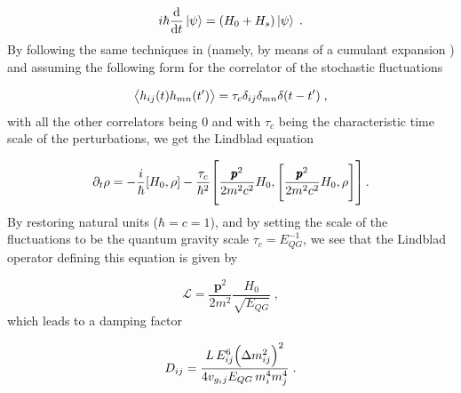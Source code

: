 \documentclass[11pt]{article}
\begin{document}
\begin{equation}
     i\hbar \dv{}{t}\ket{\psi} = \qty(H_0+H_s)\ket{\psi}\;.
\end{equation}
By following the same techniques in \cite{Petruzziello:2020wkd} (namely, by means of a cumulant expansion \cite{VANKAMPEN1974215}) and assuming the following form for the correlator of the stochastic fluctuations \cite{Breuer:2008rh}

\begin{equation}
    \expval{h_{ij}(t)h_{mn}(t^\prime)} = \tau_c \delta_{ij}\delta_{mn}\delta(t-t^\prime)\;,
\end{equation}
with all the other correlators being $0$ and with $\tau_c$ being the characteristic time scale of the perturbations, we get the Lindblad equation

\begin{equation}
    \partial_t \rho = -\frac{i}{\hbar}\comm{H_0}{\rho} - \frac{\tau_c}{\hbar^2}\comm{\frac{\pmb{p}^2}{2m^2c^2}H_0}{\comm{\frac{\pmb{p}^2}{2m^2c^2}H_0}{\rho}}\,.
\end{equation}
By restoring natural units ($\hbar=c=1$), and by setting the scale of the fluctuations to be the quantum gravity scale $\tau_c= E_{QG}^{-1}$, we see that the Lindblad operator defining this equation is given by

\begin{equation}\label{lindblad relativistic model}
    \mathcal{L} = \frac{\pmb{p}^2}{2m^2}\frac{H_0}{\sqrt{E_{QG}}}\;,
\end{equation}
which leads to a damping factor

\begin{equation}
    D_{ij} = \frac{L\,E_{ij}^6 \qty(\Delta m^2_{ij})^2}{4v_{g_ij}E_{QG}\,m_i^4m_j^4}\;.
\end{equation}


\newpage






\end{document}
